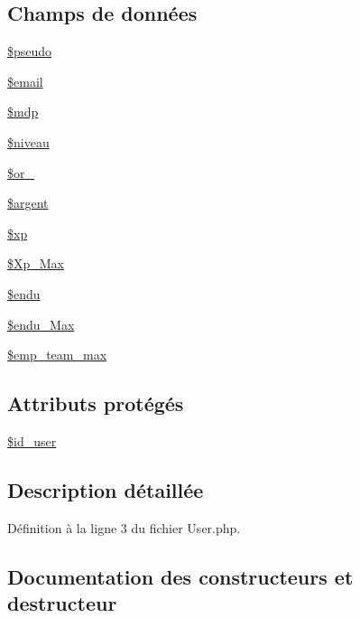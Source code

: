 \subsection*{Champs de données}
\begin{DoxyCompactItemize}
\item 
\mbox{\hyperlink{class_user_afef83346eacede41ce6c2450a64de7a8}{\$pseudo}}
\item 
\mbox{\hyperlink{class_user_a3bef7b70689d1e56cafbf750ff6a4aed}{\$email}}
\item 
\mbox{\hyperlink{class_user_a1859346ac71910451896694bf682cd89}{\$mdp}}
\item 
\mbox{\hyperlink{class_user_ad6256c6f687a1dc86e7569f5862f86b4}{\$niveau}}
\item 
\mbox{\hyperlink{class_user_af074b3f75584864604427a86112de654}{\$or\+\_\+}}
\item 
\mbox{\hyperlink{class_user_a79520a8a5b3c4631fc9f92312fc90854}{\$argent}}
\item 
\mbox{\hyperlink{class_user_a063b57fc9f20bea915e12eb745149c32}{\$xp}}
\item 
\mbox{\hyperlink{class_user_ad47865919a843bb699e5f4773c66ae71}{\$\+Xp\+\_\+\+Max}}
\item 
\mbox{\hyperlink{class_user_a7d39126b1067745a0f427c213a7c58ed}{\$endu}}
\item 
\mbox{\hyperlink{class_user_a67474e45f562e193f624e33ca7ce29a6}{\$endu\+\_\+\+Max}}
\item 
\mbox{\hyperlink{class_user_aa2f1069b6a2b570839b3f6c025d7ee64}{\$emp\+\_\+team\+\_\+max}}
\end{DoxyCompactItemize}
\subsection*{Attributs protégés}
\begin{DoxyCompactItemize}
\item 
\mbox{\hyperlink{class_user_a11f48e6bd794663966ef813a3e325c60}{\$id\+\_\+user}}
\end{DoxyCompactItemize}


\subsection{Description détaillée}


Définition à la ligne 3 du fichier User.\+php.



\subsection{Documentation des constructeurs et destructeur}
\mbox{\label{class_user_ae07b9dba276956c8b8f89c8c46ff6af5}} 
